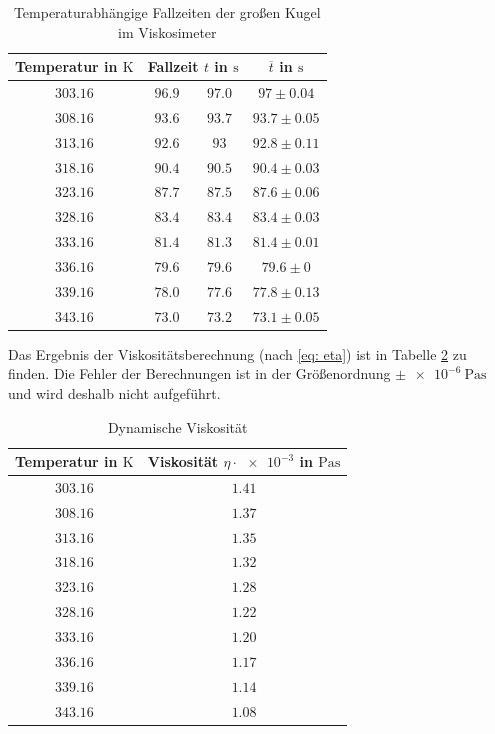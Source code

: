 \begin{table}
\centering
\begin{tabular} {cccc}
  \toprule
  Temperatur in $\si{\kelvin}$ & \multicolumn{2}{c}{Fallzeit $t$ in $\si{\second}$} & $\overline{t}$ in $\si{\second}$ \\
  \midrule
  $\num{303.16}$ & $\num{96.9}$  & $\num{97.0}$ & $\num{97}\pm\num{0.04}$ \\
  $\num{308.16}$ & $\num{93.6}$  & $\num{93.7}$ & $\num{93.7}\pm\num{0.05}$ \\
  $\num{313.16}$ & $\num{92.6}$ & $\num{93}$   & $\num{92.8}\pm\num{0.11}$ \\
  $\num{318.16}$ & $\num{90.4}$ & $\num{90.5}$ &  $\num{90.4}\pm\num{0.03}$ \\
  $\num{323.16}$ & $\num{87.7}$ & $\num{87.5}$ & $\num{87.6}\pm\num{0.06}$ \\
  $\num{328.16}$ & $\num{83.4}$ & $\num{83.4}$ & $\num{83.4}\pm\num{0.03}$ \\
  $\num{333.16}$ & $\num{81.4}$ & $\num{81.3}$ & $\num{81.4}\pm\num{0.01}$ \\
  $\num{336.16}$ & $\num{79.6}$ & $\num{79.6}$ & $\num{79.6}\pm\num{0}$ \\
  $\num{339.16}$ & $\num{78.0}$ &  $\num{77.6}$ & $\num{77.8}\pm\num{0.13}$ \\
  $\num{343.16}$ & $\num{73.0}$ & $\num{73.2}$ & $\num{73.1}\pm\num{0.05}$ \\
\bottomrule
\end{tabular}
\caption{Temperaturabhängige Fallzeiten der großen Kugel im Viskosimeter} %
\label{tab:messwerte_fallzeit_kugel_gross_temo}
\end{table}

Das Ergebnis der Viskositätsberechnung (nach \eqref{eq: eta}) ist in Tabelle \ref{tab:visko_wasser_temp} zu finden. %
Die Fehler der Berechnungen ist in der Größenordnung $\pm \SI{e-6}{\pascal\second}$ und 
wird deshalb nicht aufgeführt.

\begin{table}
\centering
\begin{tabular} {cc}
  \toprule
  Temperatur in $\si{\kelvin}$ & Viskosität $\eta\cdot\num{e-3}$ in $\si{\pascal\second}$ \\
  \midrule
  $\num{303.16}$ & $\num{1.41}$ \\
  $\num{308.16}$ & $\num{1.37}$ \\
  $\num{313.16}$ & $\num{1.35}$ \\
  $\num{318.16}$ & $\num{1.32}$ \\
  $\num{323.16}$ & $\num{1.28}$ \\
  $\num{328.16}$ & $\num{1.22}$ \\
  $\num{333.16}$ & $\num{1.20}$ \\
  $\num{336.16}$ & $\num{1.17}$ \\
  $\num{339.16}$ & $\num{1.14}$ \\
  $\num{343.16}$ & $\num{1.08}$ \\
\bottomrule
\end{tabular}
\caption{Dynamische Viskosität} %
\label{tab:visko_wasser_temp}
\end{table}

